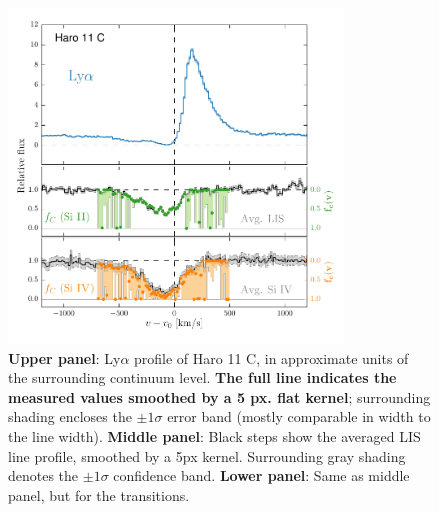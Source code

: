 \documentclass[twocolumn, trackchanges]{aastex61}
\begin{document}
\begin{figure}
\centering
\includegraphics[width=3.500in]{../Figs/LyACoverfracs.pdf}
\caption{\textbf{Upper panel}: Ly$\alpha$ profile of Haro 11 C, in
approximate units of the surrounding continuum level. \textbf{The full line
indicates the measured values smoothed by a 5 px. flat kernel}; surrounding shading
encloses the $\pm 1 \sigma$ error band (mostly comparable in width to
the line width). \textbf{Middle panel}: Black steps show the averaged
LIS line profile, smoothed by a 5px kernel. Surrounding gray shading
denotes the $\pm 1 \sigma$ confidence band. \textbf{Lower panel}: Same
as middle panel, but for the  transitions.
}\label{fig:HisLisLya}
\end{figure}
\end{document}
